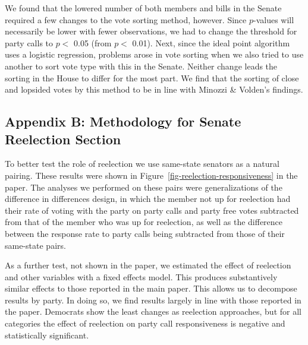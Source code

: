 \documentclass[12pt]{article}
\begin{document}
We found that the lowered number of both members and bills in the Senate required a few changes to the vote sorting method, however. Since $p$-values will necessarily be lower with fewer observations, we had to change the threshold for party calls to $p <$ 0.05 (from $p <$ 0.01). Next, since the ideal point algorithm uses a logistic regression, problems arose in vote sorting when we also tried to use another to sort vote type with this in the Senate. Neither change leads the sorting in the House to differ for the most part. We find that the sorting of close and lopsided votes by this method to be in line with Minozzi \& Volden's findings.


\clearpage

\subsection*{Appendix B: Methodology for Senate Reelection Section}
%

To better test the role of reelection we use same-state senators as a natural pairing. These results were shown in Figure~\ref{fig-reelection-responsiveness} in the paper. The analyses we performed on these pairs were generalizations of the difference in differences design, in which the member not up for reelection had their rate of voting with the party on party calls and party free votes subtracted from that of the member who was up for reelection, as well as the difference between the response rate to party calls being subtracted from those of their same-state pairs.

As a further test, not shown in the paper, we estimated the effect of reelection and other variables with a fixed effects model. This produces substantively similar effects to those reported in the main paper. This allows us to decompose results by party. In doing so, we find results largely in line with those reported in the paper. Democrats show the least changes as reelection approaches, but for all categories the effect of reelection on party call responsiveness is negative and statistically significant.
\end{document}
